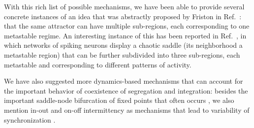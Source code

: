 With this rich list of possible mechanisms, we have been able to provide several concrete instances of an idea that was abstractly proposed by Friston in Ref.~\cite{friston2000transients}: that the same attractor can have multiple sub-regions, each corresponding to one metastable regime. An interesting instance of this has been reported in Ref.~\cite{ansmann2016selfinduced}, in which networks of spiking neurons display a chaotic saddle (its neighborhood a metastable region) that can be further subdivided into three sub-regions, each metastable and corresponding to different patterns of activity. 

We have also suggested more dynamics-based mechanisms that can account for the important behavior of coexistence of segregation and integration: besides the important saddle-node bifurcation of fixed points that often occurs \cite{tognoli2014metastable}, we also mention in-out and on-off intermittency as mechanisms that lead to variability of synchronization \cite{ashwin1994bubbling, saha2018characteristics}. 


